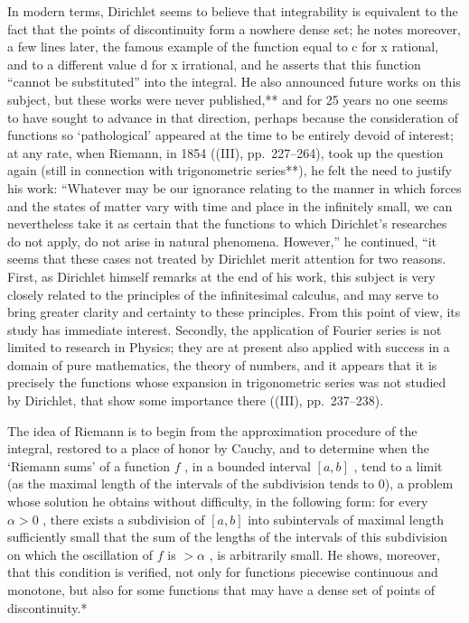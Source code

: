 In modern terms, Dirichlet seems to believe that integrability is equivalent to the fact that the points of discontinuity form a nowhere dense set; he notes moreover, a few lines later, the famous example of the function equal to c for x rational, and to a different value d for x irrational, and he asserts that this function ``cannot be substituted'' into the integral. He also announced future works on this subject, but these works were never published,** and for 25 years no one seems to have sought to advance in that direction, perhaps because the consideration of functions so `pathological' appeared at the time to be entirely devoid of interest; at any rate, when Riemann, in 1854 ((III), pp.~227--264), took up the question again (still in connection with trigonometric series**), he felt the need to justify his work: ``Whatever may be our ignorance relating to the manner in which forces and the states of matter vary with time and place in the infinitely small, we can nevertheless take it as certain that the functions to which Dirichlet's researches do not apply, do not arise in natural phenomena. However,'' he continued, ``it seems that these cases not treated by Dirichlet merit attention for two reasons. First, as Dirichlet himself remarks at the end of his work, this subject is very closely related to the principles of the infinitesimal calculus, and may serve to bring greater clarity and certainty to these principles. From this point of view, its study has immediate interest. Secondly, the application of Fourier series is not limited to research in Physics; they are at present also applied with success in a domain of pure mathematics, the theory of numbers, and it appears that it is precisely the functions whose expansion in trigonometric series was not studied by Dirichlet, that show some importance there ((III), pp.~237--238).

The idea of Riemann is to begin from the approximation procedure of the integral, restored to a place of honor by Cauchy, and to determine when the `Riemann sums' of a function \(f\) , in a bounded interval \([a, b]\) , tend to a limit (as the maximal length of the intervals of the subdivision tends to 0), a problem whose solution he obtains without difficulty, in the following form: for every \(\alpha > 0\) , there exists a subdivision of \([a, b]\) into subintervals of maximal length sufficiently small that the sum of the lengths of the intervals of this subdivision on which the oscillation of \(f\) is \(>\alpha\) , is arbitrarily small. He shows, moreover, that this condition is verified, not only for functions piecewise continuous and monotone, but also for some functions that may have a dense set of points of discontinuity.*

